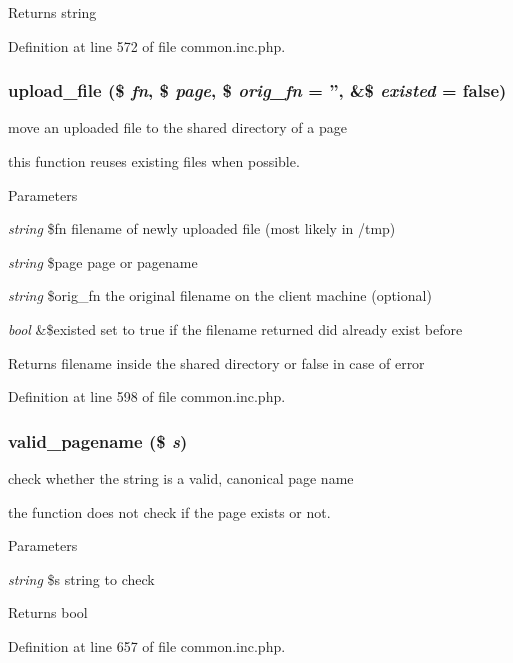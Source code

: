 \begin{DoxyReturn}{Returns}
string 
\end{DoxyReturn}


Definition at line 572 of file common.inc.php.

\hypertarget{common_8inc_8php_a4659077c34b709eec75f9897ea07e55a}{
\subsubsection[{upload\_\-file}]{\setlength{\rightskip}{0pt plus 5cm}upload\_\-file (\$ {\em fn}, \/  \$ {\em page}, \/  \$ {\em orig\_\-fn} = {\ttfamily ''}, \/  \&\$ {\em existed} = {\ttfamily false})}}
\label{common_8inc_8php_a4659077c34b709eec75f9897ea07e55a}
move an uploaded file to the shared directory of a page

this function reuses existing files when possible. 
\begin{DoxyParams}{Parameters}
\item[{\em string}]\$fn filename of newly uploaded file (most likely in /tmp) \item[{\em string}]\$page page or pagename \item[{\em string}]\$orig\_\-fn the original filename on the client machine (optional) \item[{\em bool}]\&\$existed set to true if the filename returned did already exist before \end{DoxyParams}
\begin{DoxyReturn}{Returns}
filename inside the shared directory or false in case of error 
\end{DoxyReturn}


Definition at line 598 of file common.inc.php.

\hypertarget{common_8inc_8php_a0ef613d233a6e62f7e631b8dfcd710bf}{
\subsubsection[{valid\_\-pagename}]{\setlength{\rightskip}{0pt plus 5cm}valid\_\-pagename (\$ {\em s})}}
\label{common_8inc_8php_a0ef613d233a6e62f7e631b8dfcd710bf}
check whether the string is a valid, canonical page name

the function does not check if the page exists or not. 
\begin{DoxyParams}{Parameters}
\item[{\em string}]\$s string to check \end{DoxyParams}
\begin{DoxyReturn}{Returns}
bool 
\end{DoxyReturn}


Definition at line 657 of file common.inc.php.


